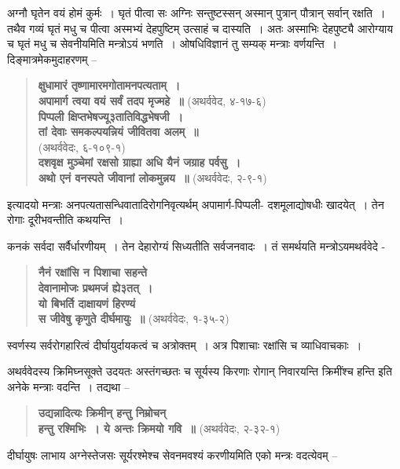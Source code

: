 {अग्नौ घृतेन वयं होमं कुर्मः~। घृतं पीत्वा सः अग्निः सन्तुष्टस्सन् अस्मान् पुत्रान् पौत्रान् सर्वान् रक्षति~। तथैव गव्यं घृतं मधु च पीत्वा अस्मभ्यं देहपुष्टिम् उत्साहं च दास्यति~। अतः अस्माभिः देहपुष्ट्यै आरोग्याय च घृतं मधु च सेवनीयमिति मन्त्रोऽयं भणति~। ओषधिविज्ञानं तु सम्यक् मन्त्राः वर्णयन्ति~। दिङ्मात्रमेकमुदाहरणम् –

\begin{verse}
\textbf{क्षुधामारं तृष्णामारमगोतामनपत्यताम्~। }\\
\textbf{अपामार्ग त्वया वयं सर्वं तदप मृज्महे~॥} (अथर्ववेद, ४-१७-६)\\
\textbf{पिप्पली क्षिप्तभेषज्यू३तातिविद्धभेषजी~। }\\
\textbf{तां देवाः समकल्पयन्नियं जीवितवा अलम्~॥}\\
\hspace{5cm}(अथर्ववेदः, ६-१०९-१)\\
\textbf{दशवृक्ष मुञ्चेमां रक्षसो ग्राह्या अधि यैनं जग्राह पर्वसु~। }\\
\textbf{अथो एनं वनस्पते जीवानां लोकमुन्नय~॥} (अथर्ववेदः, २-९-१)
\end{verse}

इत्यादयो मन्त्राः अनपत्यतासन्धिवातादिरोगनिवृत्यर्थम् अपामार्ग-पिप्पली- दशमूलाद्योषधीः खादयेत्~। तेन रोगाः दूरीभवन्तीति कथयन्ति~। 

कनकं सर्वदा सर्वैर्धारणीयम्~। तेन देहारोग्यं सिध्यतीति सर्वजनवादः~। तं समर्थयति मन्त्रोऽयमथर्ववेदे -

\begin{verse}
\textbf{नैनं रक्षांसि न पिशाचा सहन्ते}\\
\textbf{देवानामोजः प्रथमजं ह्ये३तत्~। }\\
\textbf{यो बिभर्ति दाक्षायणं हिरण्यं}\\
\textbf{स जीवेषु कृणुते दीर्घमायुः~॥} (अथर्ववेदः, १-३५-२)
\end{verse}

स्वर्णस्य सर्वरोगहारित्वं दीर्घायुर्दायकत्वं च अत्रोक्तम्~। अत्र पिशाचाः रक्षांसि च व्याधिवाचकाः~। 

अथर्ववेदस्य क्रिमिघ्नसूक्ते उदयतः अस्तंगच्छतः च सूर्यस्य किरणाः रोगान् निवारयन्ति क्रिमींश्च हन्ति इति अनेके मन्त्राः वदन्ति~। तद्यथा –

\begin{verse}
\textbf{उद्यन्नादित्यः क्रिमीन् हन्तु निम्रोचन्}\\
\textbf{हन्तु रश्मिभिः~। ये अन्तः क्रिमयो गवि~॥} (अथर्ववेदः, २-३२-१)
\end{verse}

दीर्घायुषः लाभाय अग्नेस्तेजसः सूर्यरश्मेश्च सेवनमवश्यं करणीयमिति एको मन्त्रः वदत्येवम् –

}
